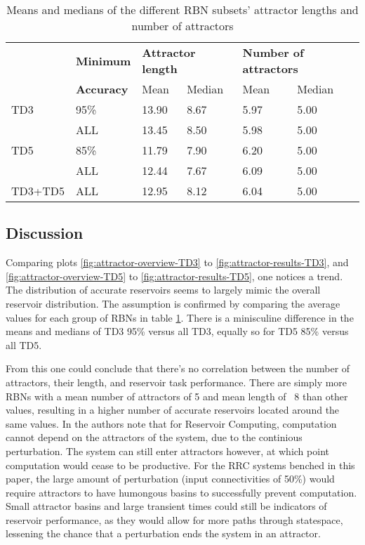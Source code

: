 \begin{table}[]
    \centering
    \caption{Means and medians of the different RBN subsets' attractor lengths and number of attractors}
    \label{tab:attractor-values}
    \begin{tabular}{llllll}
        \hline
        \hline
        & \textbf{Minimum} & \multicolumn{2}{l}{\textbf{Attractor length}} & \multicolumn{2}{l}{\textbf{Number of attractors}} \\
        & \textbf{Accuracy} & Mean & Median & Mean & Median \\
        \hline
        TD3 & 95\% & 13.90 & 8.67 & 5.97 & 5.00 \\
            & ALL  & 13.45 & 8.50 & 5.98 & 5.00 \\

        TD5 & 85\% & 11.79 & 7.90 & 6.20 & 5.00 \\
            & ALL  & 12.44 & 7.67 & 6.09 & 5.00 \\

        TD3+TD5 & ALL & 12.95 & 8.12 & 6.04 & 5.00 \\
        \hline
    \end{tabular}
\end{table}

\subsection{Discussion}

Comparing plots \ref{fig:attractor-overview-TD3} to \ref{fig:attractor-results-TD3},
and \ref{fig:attractor-overview-TD5} to \ref{fig:attractor-results-TD5},
one notices a trend.
The distribution of accurate reservoirs seems to largely mimic the overall reservoir distribution.
The assumption is confirmed by comparing the average values for each group of RBNs in table \ref{tab:attractor-values}.
There is a minisculine difference in the means and medians of TD3 95\% versus all TD3,
equally so for TD5 85\% versus all TD5.

From this one could conclude that there's no correlation between the number of attractors, their length, and reservoir task performance.
There are simply more RBNs with a mean number of attractors of 5 and mean length of ~8 than other values,
resulting in a higher number of accurate reservoirs located around the same values.
In \cite{rbn-reservoir} the authors note that for Reservoir Computing,
computation cannot depend on the attractors of the system,
due to the continious perturbation.
The system can still enter attractors however,
at which point computation would cease to be productive.
For the RRC systems benched in this paper,
the large amount of perturbation (input connectivities of 50\%) would require attractors to have humongous basins to successfully prevent computation.
Small attractor basins and large transient times could still be indicators of reservoir performance,
as they would allow for more paths through statespace, lessening the chance that a perturbation ends the system in an attractor.

